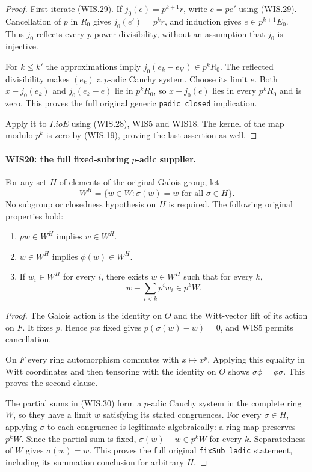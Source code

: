 \documentclass[11pt,a4paper]{article}
\numberwithin{equation}{section}
\theoremstyle{remark}\newtheorem{remark}[theorem]{Remark}
\begin{document}
\begin{proof}
First iterate (WIS.29). If $j_0(e)=p^{k+1}r$,
write $e=pe'$ using (WIS.29). Cancellation of $p$
in $R_0$ gives $j_0(e')=p^kr$, and induction gives
$e\in p^{k+1}E_0$. Thus $j_0$ reflects every
$p$-power divisibility, without an assumption that
$j_0$ is injective.

For $k\leq k'$ the approximations imply
$j_0(e_k-e_{k'})\in p^kR_0$. The reflected
divisibility makes $(e_k)$ a $p$-adic Cauchy system.
Choose its limit $e$. Both
$x-j_0(e_k)$ and $j_0(e_k-e)$ lie in $p^kR_0$,
so $x-j_0(e)$ lies in every $p^kR_0$ and is zero.
This proves the full original generic
\texttt{padic\_\allowbreak closed} implication.

Apply it to $I.ioE$ using (WIS.28), WIS5 and WIS18.
The kernel of the map modulo $p^k$ is zero by
(WIS.19), proving the last assertion as well.
\end{proof}

\paragraph{WIS20: the full fixed-subring $p$-adic supplier.}
\label{claim:WIS20}
For any set $H$ of elements of the original Galois group, let
\[
             W^H=\{w\in W:\sigma(w)=w\text{ for all }\sigma\in H\}.
\]
No subgroup or closedness hypothesis on $H$ is required.
The following original properties hold:
\begin{enumerate}
\item $pw\in W^H$ implies $w\in W^H$.
\item $w\in W^H$ implies $\phi(w)\in W^H$.
\item If $w_i\in W^H$ for every $i$, there exists $w\in W^H$
      such that for every $k$,
      \[
                  w-\sum_{i<k}p^iw_i\in p^kW.             \tag{WIS.30}
      \]
\end{enumerate}

\begin{proof}
The Galois action is the identity on $O$ and the
Witt-vector lift of its action on $F$.
It fixes $p$. Hence $pw$ fixed gives
$p(\sigma(w)-w)=0$, and WIS5 permits cancellation.

On $F$ every ring automorphism commutes with $x\mapsto x^p$.
Applying this equality in Witt coordinates and then
tensoring with the identity on $O$ shows
$\sigma\phi=\phi\sigma$. This proves the second clause.

The partial sums in (WIS.30) form a $p$-adic Cauchy
system in the complete ring $W$, so they have a
limit $w$ satisfying its stated congruences.
For every $\sigma\in H$, applying $\sigma$ to each
congruence is legitimate algebraically: a ring map
preserves $p^kW$. Since the partial sum is fixed,
$\sigma(w)-w\in p^kW$ for every $k$.
Separatedness of $W$ gives $\sigma(w)=w$.
This proves the full original
\texttt{fix\allowbreak Sub\_\allowbreak ladic} statement, including its
summation conclusion for arbitrary $H$.
\end{proof}
\end{document}
